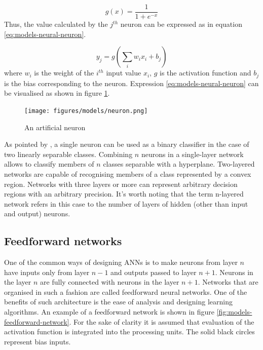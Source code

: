 \begin{equation} \label{eq:models-neural-sigmoid}
g(x) = \frac{1}{1 + e^{-x}}
\end{equation}
Thus, the value calculated by the $j^{th}$ neuron can be expressed as in equation \ref{eq:models-neural-neuron}.

\begin{equation} \label{eq:models-neural-neuron}
y_j = g(\sum_{i} w_i x_i + b_j)
\end{equation}
where $w_i$ is the weight of the $i^{th}$ input value $x_i$, $g$ is the activation function and $b_j$ is the bias corresponding to the neuron. Expression \ref{eq:models-neural-neuron} can be visualised as shown in figure \ref{fig:models-neuron}.

\begin{figure}[H]
\centering
\texttt{[image: figures/models/neuron.png]}
\caption{An artificial neuron}
\label{fig:models-neuron}
\end{figure}
%
As pointed by \cite{BISHOP1995}, a single neuron can be used as a binary classifier in the case of two linearly separable classes. Combining $n$ neurons in a single-layer network allows to classify members of $n$ classes separable with a hyperplane. Two-layered networks are capable of recognising members of a class represented by a convex region. Networks with three layers or more can represent arbitrary decision regions with an arbitrary precision.
It's worth noting that the term n-layered network refers in this case to the number of layers of hidden (other than input and output) neurons.

\subsection*{Feedforward networks}
One of the common ways of designing ANNs is to make neurons from layer $n$ have inputs only from layer $n-1$ and outputs passed to layer $n+1$. Neurons in the layer $n$ are fully connected with neurons in the layer $n+1$. Networks that are organised in such a fashion are called feedforward neural networks. One of the benefits of such architecture is the ease of analysis and designing learning algorithms. 
An example of a feedforward network is shown in figure \ref{fig:models-feedforward-network}. For the sake of clarity it is assumed that evaluation of the activation function is integrated into the processing units. The solid black circles represent bias inputs.

